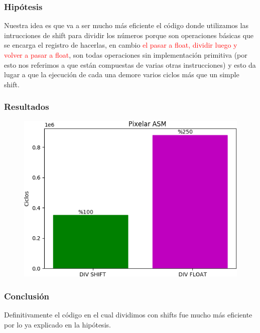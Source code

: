 \subsubsection{Hipótesis}
\par{Nuestra idea es que va a ser mucho más eficiente el código donde utilizamos las intrucciones de shift para dividir los números porque son operaciones básicas que se encarga el registro de hacerlas, en cambio \textcolor{red}{el pasar a float, dividir luego y volver a pasar a float}, son todas operaciones sin implementación primitiva (por esto nos referimos a que están compuestas de varias otras instrucciones) y esto da lugar a que la ejecución de cada una demore varios ciclos más que un simple shift.}

\subsubsection{Resultados}
\begin{figure}[H]
	\centering
	\includegraphics[width = 10 cm, height = 6 cm]{imagenes/Div_pixelar.png}
	\caption[center]{}
\end{figure}
	
\subsubsection{Conclusión}
\par{Definitivamente el código en el cual dividimos con shifts fue mucho más eficiente por lo ya explicado en la hipótesis.}